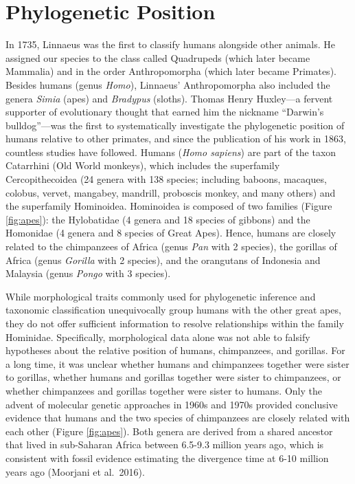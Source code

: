 \documentclass[
]{book}
\begin{document}
\hypertarget{phylogenetic-position}{%
\section{Phylogenetic Position}\label{phylogenetic-position}}

In 1735, Linnaeus was the first to classify humans alongside other animals. He assigned our species to the class called Quadrupeds (which later became Mammalia) and in the order Anthropomorpha (which later became Primates). Besides humans (genus \emph{Homo}), Linnaeus' Anthropomorpha also included the genera \emph{Simia} (apes) and \emph{Bradypus} (sloths). Thomas Henry Huxley---a fervent supporter of evolutionary thought that earned him the nickname ``Darwin's bulldog''---was the first to systematically investigate the phylogenetic position of humans relative to other primates, and since the publication of his work in 1863, countless studies have followed. Humans (\emph{Homo sapiens}) are part of the taxon Catarrhini (Old World monkeys), which includes the superfamily Cercopithecoidea (24 genera with 138 species; including baboons, macaques, colobus, vervet, mangabey, mandrill, proboscis monkey, and many others) and the superfamily Hominoidea. Hominoidea is composed of two families (Figure \ref{fig:apes}): the Hylobatidae (4 genera and 18 species of gibbons) and the Homonidae (4 genera and 8 species of Great Apes). Hence, humans are closely related to the chimpanzees of Africa (genus \emph{Pan} with 2 species), the gorillas of Africa (genus \emph{Gorilla} with 2 species), and the orangutans of Indonesia and Malaysia (genus \emph{Pongo} with 3 species).

While morphological traits commonly used for phylogenetic inference and taxonomic classification unequivocally group humans with the other great apes, they do not offer sufficient information to resolve relationships within the family Hominidae. Specifically, morphological data alone was not able to falsify hypotheses about the relative position of humans, chimpanzees, and gorillas. For a long time, it was unclear whether humans and chimpanzees together were sister to gorillas, whether humans and gorillas together were sister to chimpanzees, or whether chimpanzees and gorillas together were sister to humans. Only the advent of molecular genetic approaches in 1960s and 1970s provided conclusive evidence that humans and the two species of chimpanzees are closely related with each other (Figure \ref{fig:apes}). Both genera are derived from a shared ancestor that lived in sub-Saharan Africa between 6.5-9.3 million years ago, which is consistent with fossil evidence estimating the divergence time at 6-10 million years ago (Moorjani et al.~2016).
\end{document}
